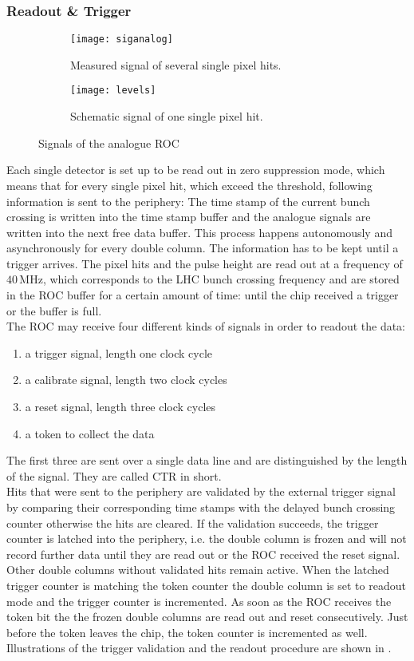 \subsubsection{Readout \& Trigger}\label{sread}
\begin{figure}[ht]
	\centering
	\begin{subfigure}[b]{0.47\textwidth}
        \texttt{[image: siganalog]}
		\caption{Measured signal of several single pixel hits.}
		\label{panasig}
	\end{subfigure}
	\hfill
	\begin{subfigure}[b]{0.47\textwidth}
		\texttt{[image: levels]}
		\caption{Schematic signal of one single pixel hit.}
		\label{p7}
	\end{subfigure}
	\caption{Signals of the analogue \ac{ROC}}
	\label{procsig}
\end{figure}
Each single detector is set up to be read out in zero suppression mode, which means that for every single pixel hit, which exceed the threshold, following information is sent to the periphery: The time stamp of the current bunch crossing is written into the time stamp buffer and the analogue signals are written into the next free data buffer. This process happens autonomously and asynchronously for every double column. The information has to be kept until a trigger arrives. The pixel hits and the pulse height are read out at a frequency of $40\,$MHz, which corresponds to the \ac{LHC} bunch crossing frequency and are stored in the \ac{ROC} buffer for a certain amount of time: until the chip received a trigger or the buffer is full.\\
The \ac{ROC} may receive four different kinds of signals in order to readout the data:
\begin{enumerate}
	\item a trigger signal, length one clock cycle
	\item a calibrate signal, length two clock cycles
	\item a reset signal, length three clock cycles
	\item a token to collect the data
\end{enumerate}
The first three are sent over a single data line and are distinguished by the length of the signal. They are called \ac{CTR} in short.\\
Hits that were sent to the periphery are validated by the external trigger signal by comparing their corresponding time stamps with the delayed bunch crossing counter otherwise the hits are cleared. If the validation succeeds, the trigger counter is latched into the periphery, i.e. the double column is frozen and will not record further data until they are read out or the \ac{ROC} received the reset signal. Other double columns without validated hits remain active. When the latched trigger counter is matching the token counter the double column is set to readout mode and the trigger counter is incremented. As soon as the \ac{ROC} receives the token bit the the frozen double columns are read out and reset consecutively. Just before the token leaves the chip, the token counter is incremented as well. Illustrations of the trigger validation and the readout procedure are shown in . \\

